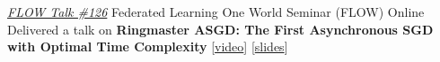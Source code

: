 \documentclass[10pt,a4paper,sans]{moderncv}        %
\newcommand{\red}{\color{cherry}}
\newcommand{\kaust}{KAUST}
\newcommand{\thuwal}{Thuwal, Saudi Arabia}
\newcommand{\highlight}[1]{{\red #1}}
\begin{document}



    {\textcolor{accent}{\href{https://sites.google.com/view/one-world-seminar-series-flow/archive/2025?authuser=0\#h.99nho9x1b8ju}{\textit{FLOW Talk \#126}}}}
    {Federated Learning One World Seminar (FLOW)}
    {Online}{}
    {
      Delivered a talk on \textbf{Ringmaster ASGD: The First Asynchronous SGD\\
      with Optimal Time Complexity} [{\textcolor{orange}{\href{https://youtu.be/DJI1SWfG6ME?si=VJGtD1G840gO5d-w}{video}}}] [{\href{https://artomaranjyan.github.io/assets/pdf/Ringmaster_FLOW.pdf}{slides}}]
    }
\end{document}
